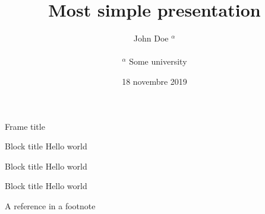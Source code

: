 \documentclass[aspectratio=169]{beamer}
\begin{document}
\title{Most simple presentation}
\author{John Doe $^{\alpha}$\\~\\
\small{$^{\alpha}$ Some university}} 
\date{18 novembre 2019} 
\frame[plain]{\titlepage} 

\begin{frame}{Frame title}
\begin{exampleblock}{Block title}
Hello world
\end{exampleblock}
\begin{block}{Block title}
Hello world
\end{block}
\begin{alertblock}{Block title}
Hello world
\end{alertblock}
A reference in a footnote 
\end{frame}
\end{document}
